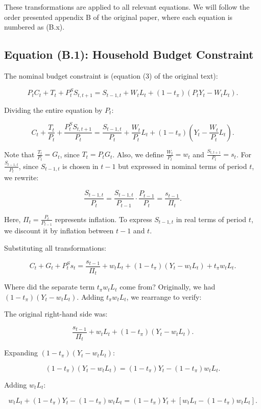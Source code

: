 \documentclass[12pt]{article}
\begin{document}
These transformations are applied to all relevant equations. We will follow the order presented appendix B of the original paper, where each equation is numbered as (B.x).


\subsection{Equation (B.1): Household Budget Constraint}

The nominal budget constraint is (equation (3) of the original text):

\[
P_t C_t + T_t + P_t^S S_{t,t+1} = S_{t-1,t} + W_t L_t + (1 - t_\pi)(P_t Y_t - W_t L_t).
\]

Dividing the entire equation by \(P_t\):

\[
C_t + \frac{T_t}{P_t} + \frac{P_t^S S_{t,t+1}}{P_t} = \frac{S_{t-1,t}}{P_t} + \frac{W_t}{P_t} L_t + (1 - t_\pi) \left(Y_t - \frac{W_t}{P_t} L_t\right).
\]

Note that \(\frac{T_t}{P_t} = G_t\), since \(T_t = P_t G_t\). Also, we define \(\frac{W_t}{P_t} = w_t\) and \(\frac{S_{t,t+1}}{P_t} = s_t\). For \(\frac{S_{t-1,t}}{P_t}\), since \(S_{t-1,t}\) is chosen in \(t-1\) but expressed in nominal terms of period \(t\), we rewrite:

\[
\frac{S_{t-1,t}}{P_t} = \frac{S_{t-1,t}}{P_{t-1}} \cdot \frac{P_{t-1}}{P_t} = \frac{s_{t-1}}{\Pi_t}.
\]

Here, \(\Pi_t = \frac{P_t}{P_{t-1}}\) represents inflation. To express \(S_{t-1,t}\) in real terms of period \(t\), we discount it by inflation between \(t-1\) and \(t\).

Substituting all transformations:

\[
C_t + G_t + P_t^S s_t = \frac{s_{t-1}}{\Pi_t} + w_t L_t + (1 - t_\pi)(Y_t - w_t L_t) + t_\pi w_t L_t.
\]

Where did the separate term \(t_\pi w_t L_t\) come from? Originally, we had \((1 - t_\pi)(Y_t - w_t L_t)\). Adding \(t_\pi w_t L_t\), we rearrange to verify:

The original right-hand side was:

\[
\frac{s_{t-1}}{\Pi_t} + w_t L_t + (1 - t_\pi)(Y_t - w_t L_t).
\]

Expanding \((1 - t_\pi)(Y_t - w_t L_t)\):

\[
(1 - t_\pi)(Y_t - w_t L_t) = (1 - t_\pi) Y_t - (1 - t_\pi) w_t L_t.
\]

Adding \(w_t L_t\):

\[
w_t L_t + (1 - t_\pi) Y_t - (1 - t_\pi) w_t L_t = (1 - t_\pi) Y_t + [w_t L_t - (1 - t_\pi) w_t L_t].
\]
\end{document}
